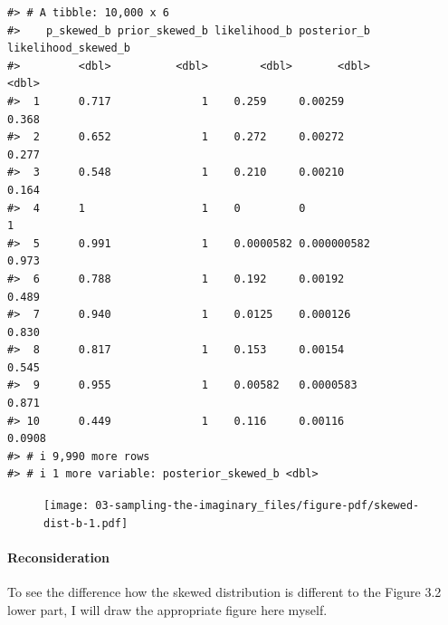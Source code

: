 \documentclass[
  letterpaper,
  DIV=11,
  numbers=noendperiod]{scrreprt}
\let\oldparagraph\paragraph
\renewcommand{\paragraph}[1]{\oldparagraph{#1}\mbox{}}
\begin{document}
\begin{verbatim}
#> # A tibble: 10,000 x 6
#>    p_skewed_b prior_skewed_b likelihood_b posterior_b likelihood_skewed_b
#>         <dbl>          <dbl>        <dbl>       <dbl>               <dbl>
#>  1      0.717              1    0.259     0.00259                  0.368 
#>  2      0.652              1    0.272     0.00272                  0.277 
#>  3      0.548              1    0.210     0.00210                  0.164 
#>  4      1                  1    0         0                        1     
#>  5      0.991              1    0.0000582 0.000000582              0.973 
#>  6      0.788              1    0.192     0.00192                  0.489 
#>  7      0.940              1    0.0125    0.000126                 0.830 
#>  8      0.817              1    0.153     0.00154                  0.545 
#>  9      0.955              1    0.00582   0.0000583                0.871 
#> 10      0.449              1    0.116     0.00116                  0.0908
#> # i 9,990 more rows
#> # i 1 more variable: posterior_skewed_b <dbl>
\end{verbatim}

\begin{figure}[H]

{\centering \texttt{[image: 03-sampling-the-imaginary\_files/figure-pdf/skewed-dist-b-1.pdf]}

}

\end{figure}

\hypertarget{reconsideration-2}{%
\paragraph{Reconsideration}\label{reconsideration-2}}

To see the difference how the skewed distribution is different to the
Figure 3.2 lower part, I will draw the appropriate figure here myself.
\end{document}
